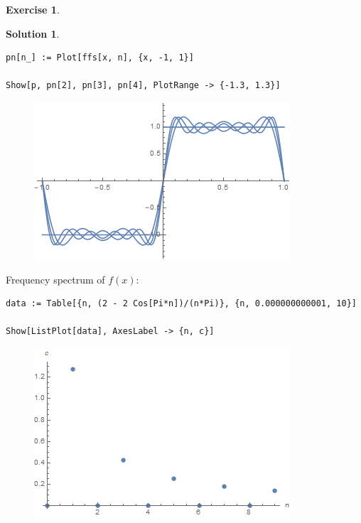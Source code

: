 \documentclass{article}
\theoremstyle{definition}
\newtheorem*{exer*}{Exercise}
\newtheorem*{sln*}{Solution}
\begin{document}
\begin{exer*}
\begin{sln*}
\begin{lstlisting}
pn[n_] := Plot[ffs[x, n], {x, -1, 1}]

Show[p, pn[2], pn[3], pn[4], PlotRange -> {-1.3, 1.3}]
		\end{lstlisting}
		
		\begin{figure}[h!]
			\centering
			\includegraphics[scale=0.75]{ffs1.png}
		\end{figure}
	
		Frequency spectrum of $f(x)$:
		
		\begin{lstlisting}
data := Table[{n, (2 - 2 Cos[Pi*n])/(n*Pi)}, {n, 0.000000000001, 10}]

Show[ListPlot[data], AxesLabel -> {n, c}]
		\end{lstlisting}
	
		\begin{figure}[h!]
			\centering
			\includegraphics[scale=0.75]{ffs2.png}
		\end{figure}
		
	\end{sln*}
\end{exer*}

\newpage
\end{document}
